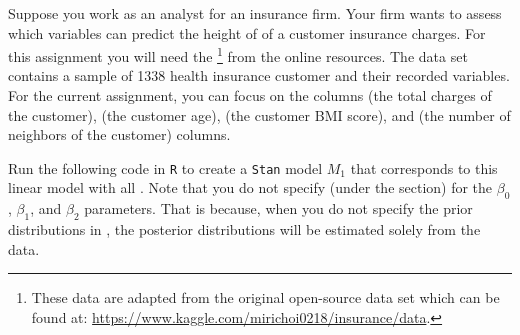 \setcounter{chapter}{8}
\setcounter{section}{6}
\setcounter{question}{0}



Suppose you work as an analyst for an insurance firm. Your firm wants to assess which variables can predict the height of of a customer insurance charges. For this assignment you will need the \footnote{These data are adapted from the original open-source data set which can be found at: \url{https://www.kaggle.com/mirichoi0218/insurance/data}.} from the online resources. The data set contains a sample of 1338 health insurance customer and their recorded variables. For the current assignment, you can focus on the columns  (the total charges of the customer),  (the customer age),  (the customer BMI score), and  (the number of neighbors of the customer) columns. \\


\rcodeanswertiny



Run the following code in \texttt{R} to create a \texttt{Stan} model $M_1$ that corresponds to this linear model with all . Note that you do not specify  (under the  section) for the $\beta_0$, $\beta_1$, and $\beta_2$ parameters. That is because, when you do not specify the prior distributions in , the posterior distributions will be estimated solely from the data. \\

\clearpage %

